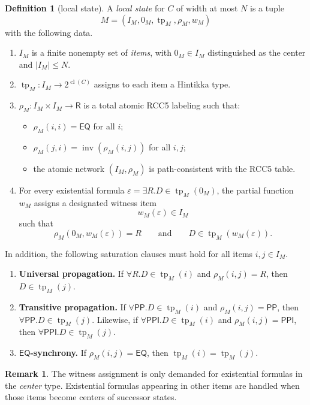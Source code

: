 \documentclass[11pt]{article}
\theoremstyle{definition}
\newtheorem{definition}[theorem]{Definition}
\newtheorem{remark}[theorem]{Remark}
\newcommand{\cl}{\operatorname{cl}}
\newcommand{\tp}{\operatorname{tp}}
\newcommand{\Roles}{\mathsf{R}}
\newcommand{\Eq}{\mathsf{EQ}}
\newcommand{\Pp}{\mathsf{PP}}
\newcommand{\Ppi}{\mathsf{PPI}}
\newcommand{\inv}{\operatorname{inv}}
\begin{document}
\begin{definition}[local state]
A \emph{local state} for $C$ of width at most $N$ is a tuple
\[
M=(I_M,0_M,\tp_M,\rho_M,w_M)
\]
with the following data.
\begin{enumerate}[label=(S\arabic*)]
    \item $I_M$ is a finite nonempty set of \emph{items}, with $0_M\in I_M$ distinguished as the center and $|I_M|\leq N$.
    \item $\tp_M:I_M\to 2^{\cl(C)}$ assigns to each item a Hintikka type.
    \item $\rho_M:I_M\times I_M\to \Roles$ is a total atomic RCC5 labeling such that:
    \begin{itemize}
        \item $\rho_M(i,i)=\Eq$ for all $i$;
        \item $\rho_M(j,i)=\inv(\rho_M(i,j))$ for all $i,j$;
        \item the atomic network $(I_M,\rho_M)$ is path-consistent with the RCC5 table.
    \end{itemize}
    \item For every existential formula $\varepsilon=\exists R.D\in \tp_M(0_M)$, the partial function $w_M$ assigns a designated witness item
    \[
    w_M(\varepsilon)\in I_M
    \]
    such that
    \[
    \rho_M(0_M,w_M(\varepsilon))=R
    \qquad\text{and}\qquad
    D\in \tp_M(w_M(\varepsilon)).
    \]
\end{enumerate}
In addition, the following saturation clauses must hold for all items $i,j\in I_M$.
\begin{enumerate}[label=(L\arabic*)]
    \item \textbf{Universal propagation.} If $\forall R.D\in \tp_M(i)$ and $\rho_M(i,j)=R$, then $D\in \tp_M(j)$.
    \item \textbf{Transitive propagation.} If $\forall \Pp.D\in \tp_M(i)$ and $\rho_M(i,j)=\Pp$, then $\forall \Pp.D\in \tp_M(j)$. Likewise, if $\forall \Ppi.D\in \tp_M(i)$ and $\rho_M(i,j)=\Ppi$, then $\forall \Ppi.D\in \tp_M(j)$.
    \item \textbf{$\Eq$-synchrony.} If $\rho_M(i,j)=\Eq$, then $\tp_M(i)=\tp_M(j)$.
\end{enumerate}
\end{definition}

\begin{remark}
The witness assignment is only demanded for existential formulas in the \emph{center} type. Existential formulas appearing in other items are handled when those items become centers of successor states.
\end{remark}
\end{document}
